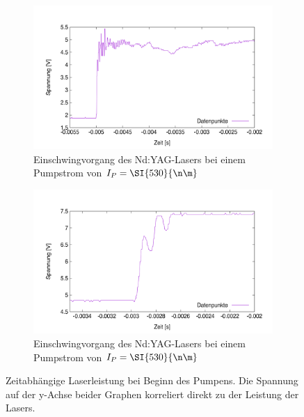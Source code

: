 \documentclass[../../../main.tex]{subfiles}
\begin{document}
    \begin{figure}[H]
        \centering
        \begin{subfigure}[b]{11cm}
            \centering
            \includegraphics[width=\textwidth]{Bilddateien/6/spikes_450nm.png}
            \caption{Einschwingvorgang des Nd:YAG-Lasers bei einem Pumpstrom von $I_P = \SI{530}{\n\m}$}
            \label{fig:Auswertung:6:Spikes450nm}
        \end{subfigure}
        \hfill
        \begin{subfigure}[b]{11cm}
            \centering
            \includegraphics[width=\textwidth]{Bilddateien/6/spikes_530nm.png}
            \caption{Einschwingvorgang des Nd:YAG-Lasers bei einem Pumpstrom von $I_P = \SI{530}{\n\m}$}
            \label{fig:Auswertung:6:Spikes530nm}
        \end{subfigure}
        \caption{Zeitabhängige Laserleistung bei Beginn des Pumpens. Die Spannung auf der y-Achse beider Graphen korreliert direkt zu der Leistung der Lasers.}
        \label{fig:Auswertung:6:Spikes}
   \end{figure}
\end{document}
